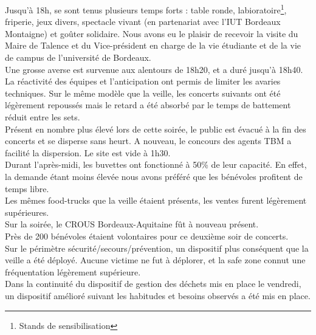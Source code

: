 \documentclass[12pt,a4paper]{report}
\begin{document}
Jusqu'à 18h, se sont tenus plusieurs temps forts : table ronde, labioratoire\footnote{Stands de sensibilisation}, friperie, jeux divers, spectacle vivant (en partenariat avec l'IUT Bordeaux Montaigne) et goûter solidaire. Nous avons eu le plaisir de recevoir la visite du Maire de Talence et du Vice-président en charge de la vie étudiante et de la vie de campus de l'université de Bordeaux.\\

Une grosse averse est survenue aux alentours de 18h20, et a duré jusqu'à 18h40. La réactivité des équipes et l'anticipation ont permis de limiter les avaries techniques. Sur le même modèle que la veille, les concerts suivants ont été légèrement repoussés mais le retard a été absorbé par le temps de battement réduit entre les sets.\\

Présent en nombre plus élevé lors de cette soirée, le public est évacué à la fin des concerts et se disperse sans heurt. A nouveau, le concours des agents TBM a facilité la dispersion. Le site est vide à 1h30.\\

Durant l'après-midi, les buvettes ont fonctionné à 50\% de leur capacité. En effet, la demande étant moins élevée nous avons préféré que les bénévoles profitent de temps libre.\\


Les mêmes food-trucks que la veille étaient présents, les ventes furent légèrement supérieures.\\

Sur la soirée, le CROUS Bordeaux-Aquitaine fût à nouveau présent.\\

Près de 200 bénévoles étaient volontaires pour ce deuxième soir de concerts.\\

Sur le périmètre sécurité/secours/prévention, un dispositif plus conséquent que la veille a été déployé. Aucune victime ne fut à déplorer, et la safe zone connut une fréquentation légèrement supérieure.\\

Dans la continuité du dispositif de gestion des déchets mis en place le vendredi, un dispositif amélioré suivant les habitudes et besoins observés a été mis en place.
\end{document}
